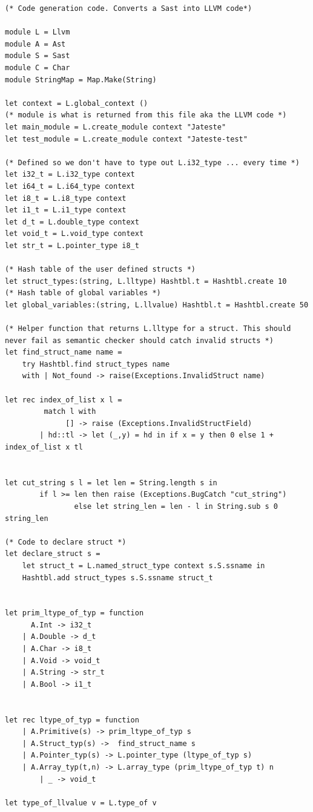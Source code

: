 \documentclass{article}
\begin{document}
\begin{lstlisting}
(* Code generation code. Converts a Sast into LLVM code*)

module L = Llvm
module A = Ast
module S = Sast
module C = Char
module StringMap = Map.Make(String)

let context = L.global_context () 
(* module is what is returned from this file aka the LLVM code *)
let main_module = L.create_module context "Jateste" 
let test_module = L.create_module context "Jateste-test" 

(* Defined so we don't have to type out L.i32_type ... every time *)
let i32_t = L.i32_type context
let i64_t = L.i64_type context
let i8_t = L.i8_type context
let i1_t = L.i1_type context
let d_t = L.double_type context
let void_t = L.void_type context
let str_t = L.pointer_type i8_t 

(* Hash table of the user defined structs *)
let struct_types:(string, L.lltype) Hashtbl.t = Hashtbl.create 10
(* Hash table of global variables *)
let global_variables:(string, L.llvalue) Hashtbl.t = Hashtbl.create 50

(* Helper function that returns L.lltype for a struct. This should never fail as semantic checker should catch invalid structs *)
let find_struct_name name = 
	try Hashtbl.find struct_types name
	with | Not_found -> raise(Exceptions.InvalidStruct name)

let rec index_of_list x l = 
         match l with
           	  [] -> raise (Exceptions.InvalidStructField)
 		| hd::tl -> let (_,y) = hd in if x = y then 0 else 1 + index_of_list x tl


let cut_string s l = let len = String.length s in 
		if l >= len then raise (Exceptions.BugCatch "cut_string")
			    else let string_len = len - l in String.sub s 0 string_len

(* Code to declare struct *)
let declare_struct s =
	let struct_t = L.named_struct_type context s.S.ssname in
	Hashtbl.add struct_types s.S.ssname struct_t


let prim_ltype_of_typ = function
	  A.Int -> i32_t
	| A.Double -> d_t
	| A.Char -> i8_t
	| A.Void -> void_t
	| A.String -> str_t
	| A.Bool -> i1_t


let rec ltype_of_typ = function
	| A.Primitive(s) -> prim_ltype_of_typ s
	| A.Struct_typ(s) ->  find_struct_name s
	| A.Pointer_typ(s) -> L.pointer_type (ltype_of_typ s)
	| A.Array_typ(t,n) -> L.array_type (prim_ltype_of_typ t) n
    	| _ -> void_t 

let type_of_llvalue v = L.type_of v


\end{lstlisting}
\end{document}

